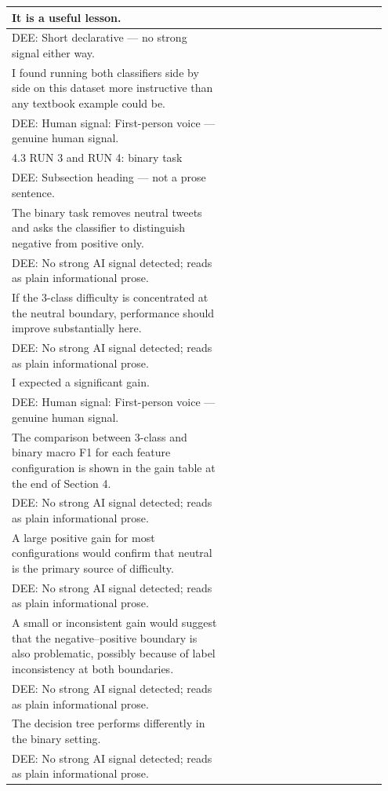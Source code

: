 \documentclass[11pt]{article}
\begin{document}
\begin{longtable}{|p{0.55\linewidth}|p{0.40\linewidth}|}
\hline
It is a useful lesson. & \\[2pt]
\hline
DEE: Short declarative --- no strong signal either way. & \\
\hline
I found running both classifiers side by side on this dataset more instructive than any textbook example could be. & \\[2pt]
\hline
DEE: Human signal: First-person voice --- genuine human signal. & \\
\hline
4.3 RUN 3 and RUN 4: binary task & \\[2pt]
\hline
DEE: Subsection heading --- not a prose sentence. & \\
\hline
The binary task removes neutral tweets and asks the classifier to distinguish negative from positive only. & \\[2pt]
\hline
DEE: No strong AI signal detected; reads as plain informational prose. & \\
\hline
If the 3-class difficulty is concentrated at the neutral boundary, performance should improve substantially here. & \\[2pt]
\hline
DEE: No strong AI signal detected; reads as plain informational prose. & \\
\hline
I expected a significant gain. & \\[2pt]
\hline
DEE: Human signal: First-person voice --- genuine human signal. & \\
\hline
The comparison between 3-class and binary macro F1 for each feature configuration is shown in the gain table at the end of Section 4. & \\[2pt]
\hline
DEE: No strong AI signal detected; reads as plain informational prose. & \\
\hline
A large positive gain for most configurations would confirm that neutral is the primary source of difficulty. & \\[2pt]
\hline
DEE: No strong AI signal detected; reads as plain informational prose. & \\
\hline
A small or inconsistent gain would suggest that the negative--positive boundary is also problematic, possibly because of label inconsistency at both boundaries. & \\[2pt]
\hline
DEE: No strong AI signal detected; reads as plain informational prose. & \\
\hline
The decision tree performs differently in the binary setting. & \\[2pt]
\hline
DEE: No strong AI signal detected; reads as plain informational prose. & \\

\end{longtable}
\end{document}

